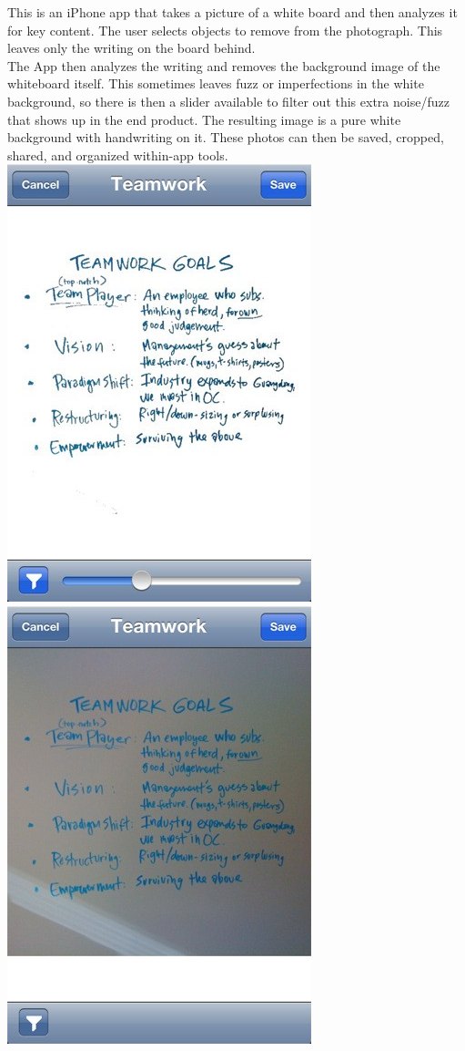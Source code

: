 \documentclass[]{article}
\begin{document}
			This is an iPhone app that takes a picture of a white board and then analyzes it for key content. The user selects objects to remove from the photograph. This leaves only the writing on the board behind.\\
			
			The App then analyzes the writing and removes the background image of the whiteboard itself. This sometimes leaves fuzz or imperfections in the white background, so there is then a slider available to filter out this extra noise/fuzz that shows up in the end product. The resulting image is a pure white background with handwriting on it. These photos can then be saved, cropped, shared, and organized within-app tools.\\
			
			\includegraphics{images/team1.jpg}
			\includegraphics{images/team2.jpg}
			
\end{document}
